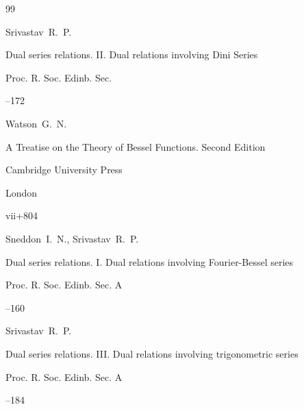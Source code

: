 \begin{thebibliography}{99}

\by Srivastav~R.~P.

\paper Dual series relations. II. Dual relations involving Dini Series

\jour Proc. R. Soc. Edinb. Sec.




--172





\by Watson~G.~N.

\book A Treatise on the Theory of Bessel Functions.  Second Edition


\publ Cambridge University Press

\publaddr London

\totalpages vii+804







\by Sneddon~I.~N., Srivastav~R.~P.

\paper Dual series relations. I. Dual relations involving Fourier-Bessel series

\jour Proc. R. Soc. Edinb. Sec. A




--160





\by Srivastav~R.~P.

\paper Dual series relations. III. Dual relations involving trigonometric series

\jour Proc. R. Soc. Edinb. Sec. A




--184






\end{thebibliography}
